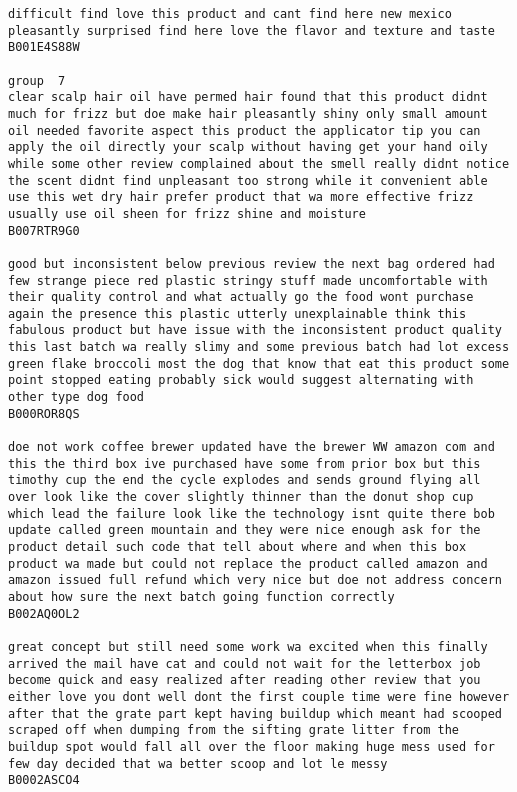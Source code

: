 \documentclass[11pt]{article}
\begin{document}
\begin{Verbatim}[commandchars=\\\{\}]
difficult find love this product and cant find here new mexico pleasantly surprised find here love the flavor and texture and taste
B001E4S88W

group  7
clear scalp hair oil have permed hair found that this product didnt much for frizz but doe make hair pleasantly shiny only small amount oil needed favorite aspect this product the applicator tip you can apply the oil directly your scalp without having get your hand oily while some other review complained about the smell really didnt notice the scent didnt find unpleasant too strong while it convenient able use this wet dry hair prefer product that wa more effective frizz usually use oil sheen for frizz shine and moisture
B007RTR9G0

good but inconsistent below previous review the next bag ordered had few strange piece red plastic stringy stuff made uncomfortable with their quality control and what actually go the food wont purchase again the presence this plastic utterly unexplainable think this fabulous product but have issue with the inconsistent product quality this last batch wa really slimy and some previous batch had lot excess green flake broccoli most the dog that know that eat this product some point stopped eating probably sick would suggest alternating with other type dog food
B000ROR8QS

doe not work coffee brewer updated have the brewer WW amazon com and this the third box ive purchased have some from prior box but this timothy cup the end the cycle explodes and sends ground flying all over look like the cover slightly thinner than the donut shop cup which lead the failure look like the technology isnt quite there bob update called green mountain and they were nice enough ask for the product detail such code that tell about where and when this box product wa made but could not replace the product called amazon and amazon issued full refund which very nice but doe not address concern about how sure the next batch going function correctly
B002AQ0OL2

great concept but still need some work wa excited when this finally arrived the mail have cat and could not wait for the letterbox job become quick and easy realized after reading other review that you either love you dont well dont the first couple time were fine however after that the grate part kept having buildup which meant had scooped scraped off when dumping from the sifting grate litter from the buildup spot would fall all over the floor making huge mess used for few day decided that wa better scoop and lot le messy
B0002ASCO4


\end{Verbatim}
\end{document}
